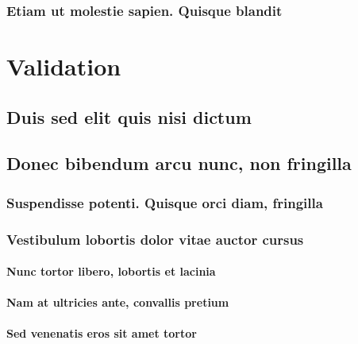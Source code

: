 \documentclass[%
  german,%
  exercise,%
  oneside,%
]{iswartcl}
\begin{document}
\lipsum[1-8]

\subsection{Etiam ut molestie sapien. Quisque blandit}

\lipsum[1-8]





\chapter{Validation}

\lipsum[1-8]

\section{Duis sed elit quis nisi dictum}

\lipsum[1-8]

\section{Donec bibendum arcu nunc, non fringilla}

\lipsum[1-8]

\subsection{Suspendisse potenti. Quisque orci diam, fringilla}

\lipsum[1-8]

\subsection{Vestibulum lobortis dolor vitae auctor cursus}

\lipsum[1-8]

\subsubsection{Nunc tortor libero, lobortis et lacinia}

\lipsum[1-8]

\subsubsection{Nam at ultricies ante, convallis pretium}

\lipsum[1-8]

\subsubsection{Sed venenatis eros sit amet tortor}
\end{document}
